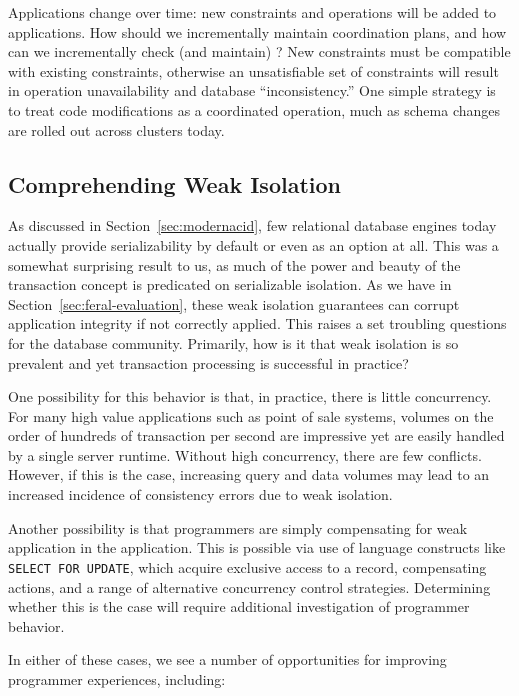  Applications change
over time: new constraints and operations will be added to
applications. How should we incrementally maintain coordination plans,
and how can we incrementally check (and maintain) \iconfluence? New
constraints must be compatible with existing constraints, otherwise an
unsatisfiable set of constraints will result in operation
unavailability and database ``inconsistency.'' One simple strategy is
to treat code modifications as a coordinated operation, much as schema
changes are rolled out across clusters today.

\subsection{Comprehending Weak Isolation}

As discussed in Section~\ref{sec:modernacid}, few relational database
engines today actually provide serializability by default or even as
an option at all. This was a somewhat surprising result to us, as much
of the power and beauty of the transaction concept is predicated on
serializable isolation. As we have in
Section~\ref{sec:feral-evaluation}, these weak isolation guarantees
can corrupt application integrity if not correctly applied. This
raises a set troubling questions for the database
community. Primarily, how is it that weak isolation is so prevalent
and yet transaction processing is successful in practice?

One possibility for this behavior is that, in practice, there is
little concurrency. For many high value applications such as point of
sale systems, volumes on the order of hundreds of transaction per
second are impressive yet are easily handled by a single server
runtime. Without high concurrency, there are few conflicts. However,
if this is the case, increasing query and data volumes may lead to an
increased incidence of consistency errors due to weak isolation.

Another possibility is that programmers are simply compensating for
weak application in the application. This is possible via use of
language constructs like \texttt{SELECT FOR UPDATE}, which acquire
exclusive access to a record, compensating actions, and a range of
alternative concurrency control strategies. Determining whether this
is the case will require additional investigation of programmer
behavior.

In either of these cases, we see a number of opportunities for improving
programmer experiences, including:

